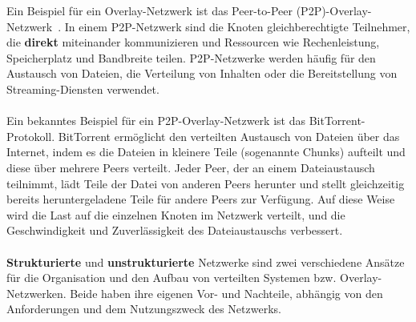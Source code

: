 \documentclass[../vs-script-first-v01.tex]{subfiles}
\begin{document}
Ein Beispiel für ein Overlay-Netzwerk ist das Peer-to-Peer (P2P)-Overlay-Netzwerk~\cite{tanenbaum2017distributed}. In einem P2P-Netzwerk sind die Knoten gleichberechtigte Teilnehmer, die \textbf{direkt} miteinander kommunizieren und Ressourcen wie Rechenleistung, Speicherplatz und Bandbreite teilen. P2P-Netzwerke werden häufig für den Austausch von Dateien, die Verteilung von Inhalten oder die Bereitstellung von Streaming-Diensten verwendet.
\\\\
Ein bekanntes Beispiel für ein P2P-Overlay-Netzwerk ist das BitTorrent-Protokoll. BitTorrent ermöglicht den verteilten Austausch von Dateien über das Internet, indem es die Dateien in kleinere Teile (sogenannte Chunks) aufteilt und diese über mehrere Peers verteilt. Jeder Peer, der an einem Dateiaustausch teilnimmt, lädt Teile der Datei von anderen Peers herunter und stellt gleichzeitig bereits heruntergeladene Teile für andere Peers zur Verfügung. Auf diese Weise wird die Last auf die einzelnen Knoten im Netzwerk verteilt, und die Geschwindigkeit und Zuverlässigkeit des Dateiaustauschs verbessert.
\\\\
\textbf{Strukturierte} und \textbf{unstrukturierte} Netzwerke sind zwei verschiedene Ansätze für die Organisation und den Aufbau von verteilten Systemen bzw. Overlay-Netzwerken. Beide haben ihre eigenen Vor- und Nachteile, abhängig von den Anforderungen und dem Nutzungszweck des Netzwerks.
\end{document}
